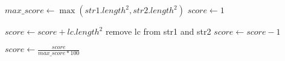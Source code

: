 \begin{algorithmic}

\State $max\_score \gets \max(str1.length^2, str2.length^2)$
\State $score \gets 1$

	\State $score \gets score + lc.length^2 $
	\State remove lc from str1 and str2
	\State $score \gets score - 1 $
\EndWhile

\State $score \gets \frac{score}{max\_score * 100} $

\EndFunction
\end{algorithmic}